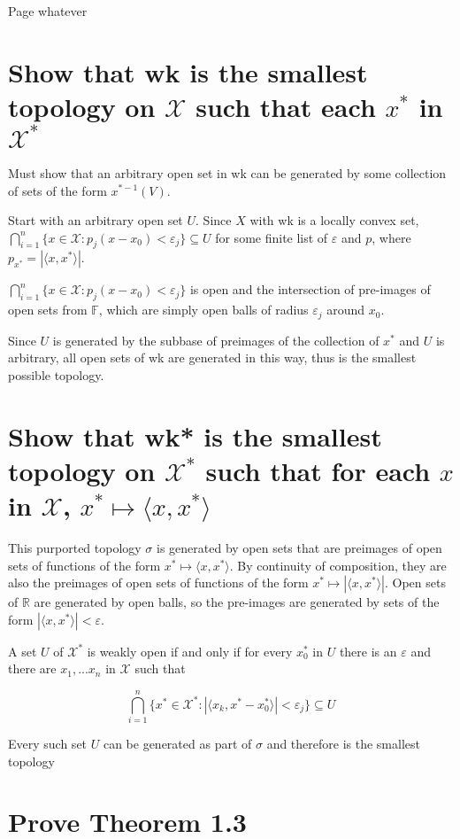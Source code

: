 \documentclass{article}
\begin{document}
Page whatever
\section{Show that wk is the smallest topology on $\mathscr{X}$ such that each $x^*$ in $\mathscr{X}^*$}

Must show that an arbitrary open set in wk can be generated by some collection of sets of the form $x^{*-1}(V)$.

Start with an arbitrary open set $U$. Since $X$ with wk is a locally convex set, $\bigcap^n_{i=1}\{x\in \mathscr{X} : p_j( x-x_0) < \varepsilon_j\} \subseteq U$ for some finite list of $\varepsilon$ and $p$, where $p_{x^*}=|\langle x,x^*\rangle|$.

 $\bigcap^n_{i=1}\{x\in \mathscr{X} : p_j( x-x_0) < \varepsilon_j\}$ is open and the intersection of pre-images of open sets from $\mathbb{F}$, which are simply open balls of radius $\varepsilon_j$ around $x_0$. 

Since $U$ is generated by the subbase of preimages of the collection of $x^*$ and $U$ is arbitrary, all open sets of wk are generated in this way, thus is the smallest possible topology.

\section{Show that wk* is the smallest topology on $\mathscr{X}^*$ such that for each $x$ in $\mathscr{X}$, $x^* \mapsto \langle x, x^* \rangle$}


This purported topology $\sigma$ is generated by open sets that are preimages of open sets of functions of the form $x^* \mapsto \langle x, x^* \rangle$. By continuity of composition, they are also the preimages of open sets of functions of the form $x^* \mapsto | \langle x, x^* \rangle | $. Open sets of $\mathbb{R}$ are generated by open balls, so the pre-images are generated by sets of the form $| \langle x, x^* \rangle | < \varepsilon $.

A set $U$ of $\mathscr{X}^*$ is weakly open if and only if for every $x^*_0$ in $U$ there is an $\varepsilon$ and there are $x_1, ... x_n$ in $\mathscr{X}$ such that 

$$\bigcap^n_{i=1}\{x^*\in \mathscr{X}^* : |\langle x_k, x^* - x^*_0 \rangle| < \varepsilon_j\} \subseteq U$$

Every such set $U$ can be generated as part of $\sigma$ and therefore is the smallest topology 

\section{Prove Theorem 1.3}
\end{document}
